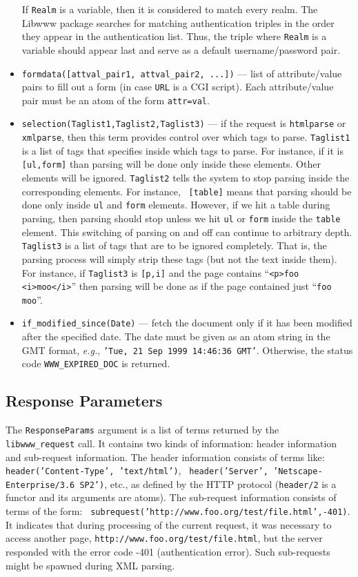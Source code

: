 \begin{itemize}
    If {\tt Realm} is a variable, then it is considered to match every
    realm. The Libwww package searches for matching authentication triples
    in the order they appear in the authentication list. Thus, the triple
    where {\tt Realm} is a variable should appear last and serve as a
    default username/password pair.
  \item {\tt formdata([attval\_pair1, attval\_pair2, ...])} --- list of
    attribute/value pairs to fill out a form (in case {\tt URL} is a CGI
    script). Each attribute/value pair must be an atom of the form
    {\tt attr=val}.
  \item {\tt selection(Taglist1,Taglist2,Taglist3)} --- if the request is
    {\tt htmlparse} or {\tt xmlparse}, then this term provides control over
    which tags to parse. {\tt Taglist1} is a list of tags that specifies
    inside which tags to parse. For instance, if it is {\tt [ul,form]}
    than parsing will be done only inside these elements. Other
    elements will be ignored. {\tt Taglist2} tells the system to stop
    parsing inside the corresponding elements. For instance, {\tt
      [table]} means that parsing should be done only inside {\tt ul} and
    {\tt form} elements. However, if we hit a table during parsing,
    then parsing should stop unless we hit {\tt ul} or {\tt form} inside
    the {\tt table} element. This switching of parsing on and off can
    continue to arbitrary depth. {\tt Taglist3} is a list of tags that are
    to be ignored completely. That is, the parsing process will simply
    strip these tags (but not the text inside them). For instance, if
    {\tt Taglist3} is {\tt [p,i]} and the page contains ``{\tt <p>foo
    <i>moo</i>}'' then parsing will be done as if the page contained just
  ``{\tt foo moo}''.
\item {\tt if\_modified\_since(Date)} --- fetch the document only if it has
  been modified after the specified date. The date must be given as an atom
  string in the GMT format, {\it e.g.}, {\tt 'Tue, 21 Sep 1999 14:46:36 GMT'}.
  Otherwise, the status code {\tt WWW\_EXPIRED\_DOC} is returned.
\end{itemize}

\subsection{Response Parameters}

The {\tt ResponseParams} argument is a list of terms returned by the {\tt
  libwww\_request} call. It contains two kinds of information: header
information and sub-request information. The header information consists of
terms like: {\tt header('Content-Type', 'text/html')}, {\tt
  header('Server', 'Netscape-Enterprise/3.6 SP2')}, etc., as defined by the
HTTP protocol ({\tt header/2} is a functor and its arguments are atoms).
The sub-request information consists of terms of the form: {\tt
  subrequest('http://www.foo.org/test/file.html',-401)}. It indicates that
during processing of the current request, it was necessary to access
another page, {\tt http://www.foo.org/test/file.html}, but the server
responded with the error code -401 (authentication error).
Such sub-requests might be spawned during XML parsing.

